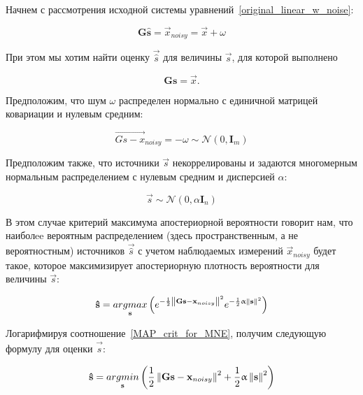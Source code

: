 Начнем с рассмотрения исходной системы уравнений~\ref{original_linear_w_noise}:

\begin{equation}
    \mathbf{G\hat{s}} = \vec{x}_{noisy} = \vec{x} + \omega
\end{equation}

При этом мы хотим найти оценку $\vec{\hat{s}}$ для величины $\vec{s}$,
для которой выполнено

\begin{equation}
    \mathbf{Gs} = \vec{x}.
\end{equation}

Предположим, что шум $\omega$ распределен нормально с единичной
матрицей ковариации и нулевым средним:

\begin{equation}
    \vec{Gs - x}_{noisy} = -\omega \sim \mathcal{N}(0, \mathbf{I}_m)
\end{equation}

Предположим также, что источники $\vec{s}$ некоррелированы и задаются
многомерным нормальным распределением с нулевым средним и дисперсией $\alpha$:

\begin{equation}
    \vec{s} \sim \mathcal{N}(0, \alpha\mathbf{I}_n)
\end{equation}

В этом случае критерий максимума апостериорной вероятности говорит нам, что
наиболee вероятным распределением (здесь пространственным, а не вероятностным)
источников $\vec{\hat{s}}$ с учетом наблюдаемых измерений
$\vec{x}_{noisy}$ будет такое, которое максимизирует апостериорную
плотность вероятности для величины $\vec{s}$:

\begin{equation}
    \mathbf{\hat{s}} =
    \underset{\mathbf{s}}{argmax} \left(
        e^{-\frac{1}{2}\left\lVert\mathbf{Gs - x}_{noisy}\right\rVert^2} e^{-\frac{1}{2}\upalpha\left\lVert\mathbf{s}\right\rVert^2}
    \right)
    \label{MAP_crit_for_MNE}
\end{equation}

Логарифмируя соотношение~\ref{MAP_crit_for_MNE}, получим следующую формулу
для оценки $\vec{\hat{s}}$:

\begin{equation}
    \mathbf{\hat{s}} =
    \underset{\mathbf{s}}{argmin} \left(
        \frac{1}{2}\left\lVert\mathbf{Gs - x}_{noisy}\right\rVert^2 + \frac{1}{2}\upalpha\left\lVert\mathbf{s}\right\rVert^2
    \right)
    \label{logMAP_crit_for_MNE}
\end{equation}

